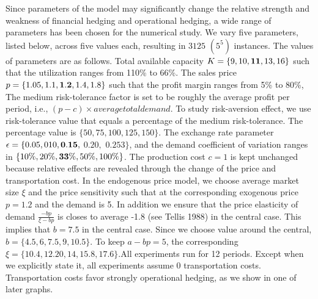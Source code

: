 \documentclass[mnsc,nonblindrev,copyedit]{informs2_wz} %
\newcommand{\OUT}[1]{}
\begin{document}
Since parameters of the model may significantly change the relative strength and weakness of financial hedging and operational hedging, a wide range of parameters has been chosen for the numerical study. We vary five parameters, listed below, across five values each, resulting in $3125$ $(5^5)$ instances.  The values of parameters are as follows. Total available capacity $K= \{9, 10, \bold{11}, 13, 16\}$ such that the utilization ranges from 110\% to 66\%. The sales price $p = \{1.05, 1.1, \bold{1.2}, 1.4, 1.8\}$ such that the profit margin ranges from 5\% to 80\%, The medium risk-tolerance factor is set to be roughly the average profit per period, i.e., $(p-c) \times average total demand$. To study risk-aversion effect, we use risk-tolerance value that equals a percentage of the medium risk-tolerance. The percentage value is $\{50, 75, 100, 125, 150\}$. The exchange rate parameter $\epsilon=\{0.05, 010, \bold{0.15},$ $0.20,$ $0.253 \}$, and the demand coefficient of variation ranges in $\{10\%, 20\%, \bold{33\%}, 50\%, 100\%\}$.  The production cost $c=1$ is kept unchanged because relative effects are revealed through the change of the price and transportation cost. In the endogenous price model, we choose average market size $\xi$ and the price sensitivity such that at the corresponding exogenous price $p=1.2$ and the demand is 5. In addition we ensure that the price elasticity of demand $\frac{-bp}{\xi-bp}$ is closes to average -1.8 (see Tellis 1988)  in the central case. This implies that $b=7.5$ in the central case. Since we choose value around the central, $b = \{4.5, 6, 7.5, 9, 10.5\}$. To keep $a-bp =5$, the corresponding $\xi = \{10.4, 12.20, 14, 15.8, 17.6\}$.All experiments run for 12  periods.  Except when we explicitly state it, all experiments assume 0 transportation costs.  Transportation costs favor strongly operational hedging, as we show in one of later graphs.



\end{document}
